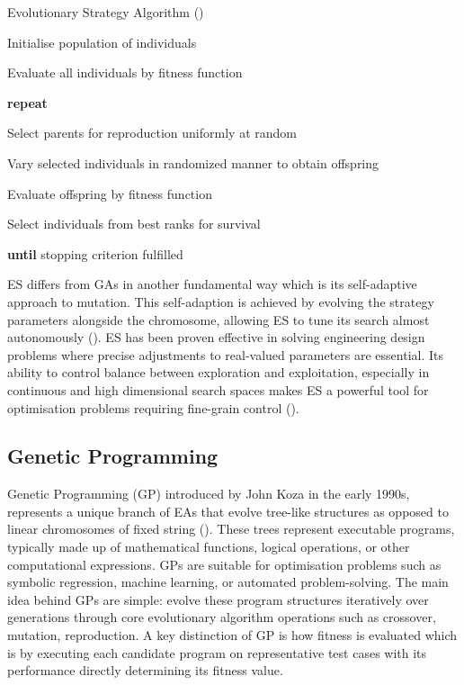\parbreak
\begin{algorithm}
	\caption{Evolutionary Strategy Algorithm (\cite{back2012handbook})}\label{alg:basic_evolutionary_strategy}
	\begin{algorithmic}[1]
	\item Initialise population of individuals
	\item Evaluate all individuals  by fitness function
	\item \textbf{repeat}
	\item \quad Select parents for reproduction uniformly at random
	\item \quad Vary selected individuals in randomized manner to obtain offspring
	\item \quad Evaluate offspring by fitness function
	\item \quad Select individuals from best ranks for survival
	\item \textbf{until} stopping criterion fulfilled
\end{algorithmic}
\end{algorithm}

\parbreak\noindent ES differs from GAs in another fundamental way which is its self-adaptive approach to mutation. This self-adaption is achieved by evolving the strategy parameters alongside the chromosome, allowing ES to tune its search almost autonomously (\cite{back2012handbook}). ES has been proven effective in solving engineering design problems where precise adjustments to real-valued parameters are essential. Its ability to control balance between exploration and exploitation, especially in continuous and high dimensional search spaces makes ES a powerful tool for optimisation problems requiring fine-grain control (\cite{book_introduction_to_evolutionary_computing}).

\subsection{Genetic Programming}\label{sec:genetic_programming}
Genetic Programming (GP) introduced by John Koza in the early 1990s, represents a unique branch of EAs that evolve tree-like structures as opposed to linear chromosomes of fixed string (\cite{koza1994genetic}). These trees represent executable programs, typically made up of mathematical functions, logical operations, or other computational expressions. GPs are suitable for optimisation problems such as symbolic regression, machine learning, or automated problem-solving. The main idea behind GPs are simple: evolve these program structures iteratively over generations through core evolutionary algorithm operations such as crossover, mutation, reproduction. A key distinction of GP is how fitness is evaluated which is by executing each candidate program on representative test cases with its performance directly determining its fitness value.

